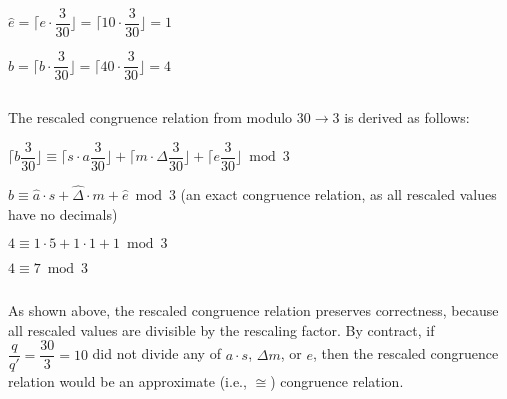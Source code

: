 $\hat{e} = \Bigg\lceil e\cdot\dfrac{3}{30} \Bigg\rfloor = \Bigg\lceil 10\cdot\dfrac{3}{30} \Bigg\rfloor = 1$

$\hat{b} = \Bigg\lceil b\cdot\dfrac{3}{30} \Bigg\rfloor = \Bigg\lceil 40\cdot\dfrac{3}{30} \Bigg\rfloor = 4$

$ $

The rescaled congruence relation from modulo $30 \rightarrow 3$ is derived as follows:

$\Bigg\lceil b\dfrac{3}{30} \Bigg\rfloor \equiv \Bigg\lceil s\cdot a \dfrac{3}{30} \Bigg\rfloor + \Bigg\lceil m \cdot \Delta \dfrac{3}{30} \Bigg\rfloor + \Bigg\lceil e \dfrac{3}{30} \Bigg\rfloor \bmod 3$

$\hat{b} \equiv \hat{a} \cdot s + \hat{\Delta} \cdot m + \hat{e}  \bmod 3$
 \text{ } (an exact congruence relation, as all rescaled values have no decimals)

$4 \equiv 1 \cdot 5 + 1 \cdot 1 + 1 \bmod 3$

$4 \equiv 7 \bmod 3$

$ $

As shown above, the rescaled congruence relation preserves correctness, because all rescaled values are divisible by the rescaling factor. By contract, if $\dfrac{q}{q'} = \dfrac{30}{3} = 10$ did not divide any of $a\cdot s$, $\Delta m$, or $e$, then the rescaled congruence relation would be an approximate (i.e., $\cong$) congruence relation. 






